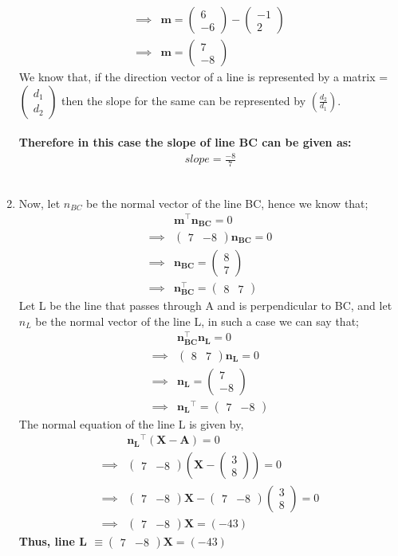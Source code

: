 \documentclass[journal,12pt,twocolumn]{IEEEtran}
\let\vec\mathbf
\providecommand{\brak}[1]{\ensuremath{\left(#1\right)}}
\newcommand{\myvec}[1]{\ensuremath{\begin{pmatrix}#1\end{pmatrix}}}
\begin{document}
\begin{enumerate}
\begin{align}
	\implies &\vec{m} = \myvec{6 \\ -6} - \myvec{-1 \\ 2}
	\\
	\implies &\vec{m} = \myvec{7 \\ -8}
    \end{align}
    We know that, if the direction vector of a line is represented by a matrix \vec{m}=\myvec{d_1\\d_2} then the slope for the same can be represented by $\brak{\frac{d_2}{d_1}}$.\\
    \medskip\\
    \textbf{Therefore in this case the slope of line BC can be given as:}
    \begin{align}
        slope=\frac{-8}{7}
    \end{align}
    \medskip\\
\item Now, let $n_{BC}$ be the normal vector of the line BC, hence we know that;
    \begin{align}
	&\vec{m}^{\top}\vec{n_{BC}} = 0
	\\
	\implies &\myvec{7 & -8}\vec{n_{BC}} = 0
	\\
	\implies &\vec{n_{BC}} = \myvec{8 \\ 7}
	\\
	\implies &\vec{n_{BC}^{\top}} = \myvec{8 & 7}
    \end{align}
     Let L be the line that passes through A and is perpendicular to BC, and let $n_L$ be the normal vector of the line L, in such a case we can say that;
     \begin{align}
	&\vec{n_{BC}^{\top}} \vec{n_L} = 0
	\\
	\implies &\myvec{8 & 7}\vec{n_L} = 0
	\\
	\implies &\vec{n_L} = \myvec{7 \\ -8}
	\\
	\implies &\vec{n_L}^{\top} = \myvec{7 & -8}
    \end{align}
    The normal equation of the line L is given by, 
    \begin{align}
	&\vec{n_L}^{\top} \brak{\vec{X}-\vec{A}} = 0
	\\
	\implies &\myvec{7 & -8}\brak{\vec{X} - \myvec{3 \\ 8}}= 0
	\\
	\implies &\myvec{7 & -8}\vec{X}- \myvec{7 & -8}\myvec{3\\8}= 0
	\\
	\implies &\myvec{7 & -8}\vec{X} = \brak{-43}
    \end{align}
    \textbf{Thus, line L $\equiv \myvec{7 & -8}\vec{X} = \brak{-43}$}
\end{enumerate}
\end{document}
